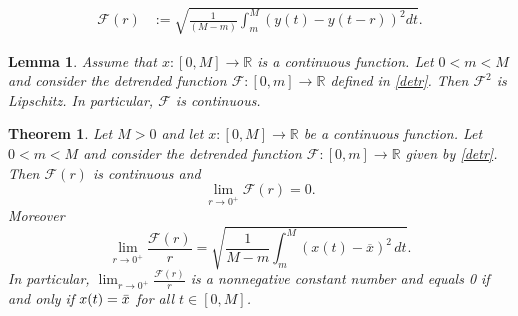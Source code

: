 \documentclass[10pt,a4paper]{amsart}
\newtheorem{lemma}{Lemma}
\newtheorem{theorem}{Theorem}
\newcommand{\R}{{\mathbb{R}}}
\begin{document}
\begin{align}\label{detr}
    \mathcal{F}(r)&:=\sqrt{\frac{1}{(M-m)}\int _{m}^{M} \left(  y(t)-y(t-r) \right)^2  dt}.
\end{align}

\begin{lemma}\label{detrendcont}
Assume that $x\colon[0,M]\to\R$ is a continuous function. Let $0<m<M$ and consider the detrended  function $\mathcal{F}\colon[0,m]\to\R$ defined in \eqref{detr}. Then $\mathcal F^2$ is Lipschitz. In particular, $\mathcal F$ is  continuous.
\end{lemma}

\begin{theorem}\label{poteF}
    Let $M>0$ and let $x\colon [0,M]\rightarrow \R$ be a continuous function.  Let $0<m<M$ and consider the detrended function $\mathcal{F}:[0,m]\rightarrow \R$ given by \eqref{detr}.
Then $\mathcal{F}(r)$ is continuous and    
\begin{equation*}
   \lim_{r\to 0^+} \mathcal{F}(r)=0.
\end{equation*}
Moreover
\begin{equation}\label{asym}
    \lim_{r\to 0^+} \frac{\mathcal{F}(r)}{r} =\sqrt{\frac{1}{M-m}\int_{m}^{M}\left(x\left(t\right)-\overline{x}\right)^2\, dt}.
\end{equation}
In particular, $\lim_{r\to 0^+} \frac{\mathcal{F}(r)}{r}$ is a nonnegative constant number and equals 0 if and only if $x(t)=\Bar{x}$ for all $t\in[0,M]$.
\end{theorem}
\end{document}
